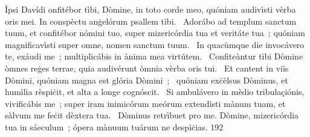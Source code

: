 { Ìpsi Davídi}
{%
onfitébor tìbi, Dòmine, in toto corde meo, quóniam audivìsti vèrba oris mei. In conspèctu anġelórum psallem tìbi. 
~Adorábo ad templum sanctum tuum, et confitébor nómini tuo, super mizericórdia tua et veritáte tua~; quóniam magnificavìsti super omne, nomen sanctum tuum. 
~In quacùmque die invocávero te, exáudi me~; multiplicábis in ànima mea virtútem. 
~Confiteàntur tìbi Dòmine òmnes reġes terrae, quia audivérunt òmnia vèrba oris tui. 
~Et cantent in viïs Dòmini, quóniam magna est glória Dòmini~; 
~quóniam exċèlsus Dòminus, et humìlia rèspiċit, et alta a longe cognóscit. 
~Si ambulávero in mèdio tribulaçiónis, vivificábis me~; super iram inimicórum meórum extendìsti mànum tuam, et sàlvum me feċit dèxtera tua. 
~Dòminus retrìbuet pro me. Dòmine, mizericórdia tua in sáeculum~; ópera mànuum tuárum ne despìċias. 
}
{19}{2}
